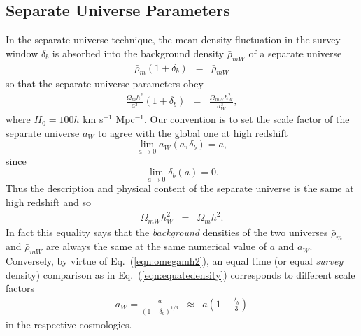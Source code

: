 \documentclass[prd,twocolumn,amsmath,amssymb,floatfix,superscriptaddress]{revtex4-1}
\newcommand{\wh}[1]{{#1}}
\newcommand{\mtrv}[1]{{#1}}
\begin{document}
\subsection{Separate Universe Parameters}
\label{sec:sepparam}
In the separate universe technique, the mean density fluctuation in the survey window
$\delta_b$ is absorbed into the background density
{$\bar{\rho}_{mW}$} 
of a separate  universe
%
\begin{eqnarray}
\bar{\rho}_m (1+\delta_b) &=&  \bar{\rho}_{mW}
\end{eqnarray}
%
so that the separate universe parameters obey
\begin{eqnarray}
\frac{\Omega_m h^2}{a^3}(1+\delta_b) &=& \frac{\Omega_{mW} h_W^{2}}{a_W^{3}},
\label{eqn:equatedensity}
\end{eqnarray}
where $H_0 = 100h$ km s$^{-1}$ Mpc$^{-1}$.  
Our convention is to set the scale factor of the separate universe $a_W$ to
agree with the global one at high redshift
\begin{equation}
\lim_{a\rightarrow 0} a_W(a,\delta_b)=a,
\end{equation}
since 
\begin{equation}
\lim_{a\rightarrow 0} \delta_b(a)=0.
\end{equation}
Thus the description and physical content of the separate universe is the same at high redshift
\wh{and so
\begin{eqnarray}
\Omega_{mW} h_W^2 &=& \Omega_m h^2.
\label{eqn:omegamh2}
\end{eqnarray}
In fact  this equality says that 
the {\it background} densities of the two universes $\bar\rho_m$ and
$\bar\rho_{mW}$ are always the same 
 at the same numerical value of $a$ and $a_W$.
Conversely, by virtue of Eq.~(\ref{eqn:omegamh2}), an equal time (or equal {\it survey} density) comparison as in Eq.~(\ref{eqn:equatedensity}) corresponds to different scale factors
\begin{eqnarray}
a_W  = \frac{a}{(1+\delta_b)^{1/3}}&\approx& a\left(1- \frac{\delta_b}{3} \right)
\label{eqn:aW}
\end{eqnarray}
in the respective cosmologies.}
\end{document}
